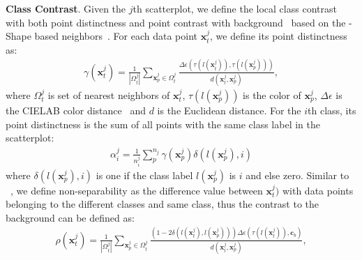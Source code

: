 \noindent\textbf{Class Contrast}.
Given the $j$th scatterplot, we define the local class contrast with both point distinctness and point contrast with background~\cite{Wang2018} based on the \alpha-Shape based neighbors~\cite{Lu21}.  For each data point $\mathbf{x}^j_t$, we define its point distinctness as:
\begin{align}\label{eq:pd}
 \gamma (\mathbf{x}^j_t)=\frac{1}{|\Omega^j_t|} \sum_{\mathbf{x}^j_p \in \Omega^j_t}  \frac{\Delta\epsilon(\tau(l(\mathbf{x}^j_t)),\tau(l(\mathbf{x}^j_p)))}{d(\mathbf{x}^j_t,\mathbf{x}^j_p)} ,
\end{align}
where $\Omega^j_t$ is set of nearest neighbors of $\mathbf{x}^j_t$, $\tau(l(\mathbf{x}^j_p))$ is the color of $\mathbf{x}^j_p$, $\Delta \epsilon$ is the CIELAB color distance~\cite{sharma2005ciede2000} and $d$ is the Euclidean distance.
For the $i$th class, its point distinctness is the sum of all points with the same class label in the scatterplot:
\begin{align}\label{eq:pdc}
 \alpha^j_i = \frac{1}{n^j_i}\sum^{n_j}_{p}\gamma(\mathbf{x}^j_p) \delta(l(\mathbf{x}^j_p),i)
\end{align}
where $\delta(l(\mathbf{x}^j_p),i)$ is one if the class label $l(\mathbf{x}^j_p)$ is $i$ and else zero.
%
%
Similar to ~\cite{Wang2018}, we define non-separability as the difference value between $\mathbf{x}^j_t)$ with data points belonging to the different classes and same class, thus the contrast to the background can be defined as:
\begin{align}\label{eq:ctb}
 \rho (\mathbf{x}^j_t)=\frac{1}{|\Omega^j_t|} \sum_{\mathbf{x}^j_p \in \Omega^j_t}  \frac{(1-2\delta(l(\mathbf{x}^j_t),l(\mathbf{x}^j_p)))\Delta\epsilon(\tau(l(\mathbf{x}^j_t)),\mathbf{c}_b)}{d(\mathbf{x}^j_t,\mathbf{x}^j_p)} ,
\end{align}
